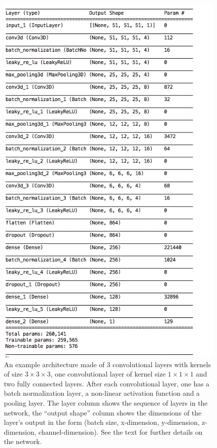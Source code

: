 \documentclass[11pt]{article}
\begin{document}
\begin{figure}[t!]
\centering
\includegraphics[width=0.65\columnwidth]{arch.png}
\caption{An example architecture made of 3 convolutional layers with kernels of size $3\times3\times3$, one convolutional layer of kernel size $1\times1\times1$ and two fully connected layers. After each convolutional layer, one has a batch normalization layer, a non-linear activation function and a pooling layer. The layer column shows the sequence of layers in the network, the ``output shape'' column shows the dimensions of the layer's output in the form (batch size, x-dimension, y-dimension, z-dimension, channel-dimension). See the text for further details on the network.}
\label{fig:CNN_architecture}
\end{figure}
\end{document}
